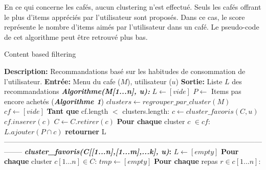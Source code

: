 \documentclass[11pt]{article}
\begin{document}
En ce qui concerne les cafés, aucun clustering n'est effectué. Seuls les cafés offrant le plus d'items appréciés par l'utilisateur sont proposés. Dans ce cas, le score représente le nombre d'items aimés par l'utilisateur dans un café. Le pseudo-code de cet algorithme peut être retrouvé plus bas.

\begin{algorithm}
    \caption{Content based filtering}
    \begin{algorithmic}[1]
        \Statex \textbf{Description:} Recommandations basé sur les habitudes de consommation de l'utilisateur.
        \Statex \textbf{Entrée:} Menu du cafe ($M$), utilisateur ($u$)
        \Statex \textbf{Sortie:} Liste $L$ des recommandations
        \State \textbf{\textit{Algorithme(M[1...n], u):}}
        \State \hspace{0.5cm} $L \leftarrow [vide]$
        \State \hspace{0.5cm} $P \leftarrow$ Items pas encore achetés (\textbf{\textit{Algorithme 1}})
        \State \hspace{0.5cm} $clusters \leftarrow regrouper\_par\_cluster(M)$
        \State \hspace{0.5cm} $cf \leftarrow [vide]$
        \State \hspace{0.5cm} \textbf{Tant que} cf.length $<$ clusters.length:
        \State \hspace{1cm} $c \leftarrow cluster\_favoris(C, u)$
        \State \hspace{1cm} $cf.inserer(c)$
        \State \hspace{1cm} $C \leftarrow C.retirer(c)$
        \State \hspace{0.5cm} \textbf{Pour chaque} cluster $c$ $\in cf$:
        \State \hspace{1cm} $L.ajouter(P \cap c)$
        \State \hspace{0.5cm} \textbf{retourner} L
        \\
--------------------------------------------------------------------------------------------------------------------
        \State \textbf{\textit{cluster\_favoris(C[[1...n],[1...m],...k], u)}:}
        \State \hspace{0.5cm} $L \leftarrow [empty]$
        \State \hspace{0.5cm} \textbf{Pour chaque} cluster $c[1...n] \in C$:
        \State \hspace{1cm} $tmp \leftarrow [empty]$
        \State \hspace{1cm} \textbf{Pour chaque} repas $r \in c[1...n]$: 

\end{algorithmic}
\end{algorithm}
\end{document}
